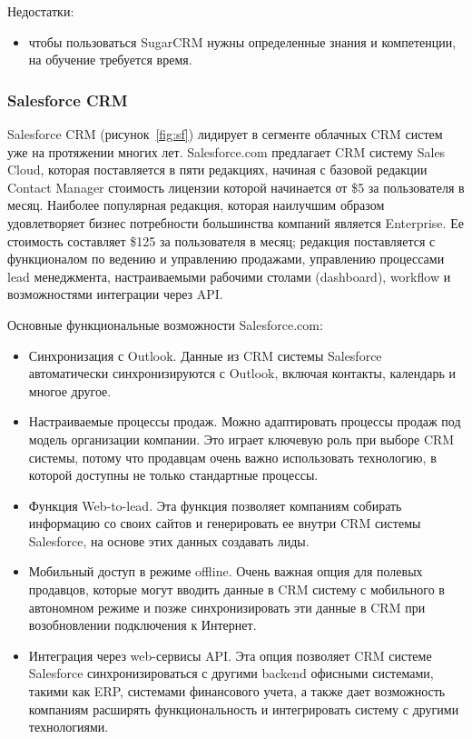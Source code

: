 Недостатки: 
\begin{itemize}
\item чтобы пользоваться SugarCRM нужны определенные знания и компетенции, на обучение требуется время.
\end{itemize}



\subsubsection{Salesforce CRM }
\label{sub:alternatives:crm:sf}
Salesforce CRM (рисунок~\ref{fig:sf}) лидирует в сегменте облачных CRM систем уже на протяжении многих лет. Salesforce.com предлагает CRM систему Sales Cloud, которая поставляется в пяти редакциях, начиная с базовой редакции Contact Manager стоимость лицензии которой начинается от \$5 за пользователя в месяц. Наиболее популярная редакция, которая наилучшим образом удовлетворяет бизнес потребности большинства компаний является Enterprise. Ее стоимость составляет \$125 за пользователя в месяц; редакция поставляется с функционалом по ведению и управлению продажами, управлению процессами lead менеджмента, настраиваемыми рабочими столами (dashboard), workflow и возможностями интеграции через API. 

Основные функциональные возможности Salesforce.com:
\begin{itemize}
\item Синхронизация с Outlook. Данные из CRM системы Salesforce автоматически синхронизируются с Outlook, включая контакты, календарь и многое другое.
\item Настраиваемые процессы продаж. Можно адаптировать процессы продаж под модель организации компании. Это играет ключевую роль при выборе CRM системы, потому что продавцам очень важно использовать технологию, в которой доступны не только стандартные процессы.
\item Функция Web-to-lead. Эта функция позволяет компаниям собирать информацию со своих сайтов и генерировать ее внутри CRM системы Salesforce, на основе этих данных создавать лиды.
\item Мобильный доступ в режиме offline. Очень важная опция для полевых продавцов, которые могут вводить данные в CRM систему с мобильного в автономном режиме и позже синхронизировать эти данные в CRM при возобновлении подключения к Интернет.
\item Интеграция через web-сервисы API. Эта опция позволяет CRM системе Salesforce синхронизироваться с другими backend офисными системами, такими как ERP, системами финансового учета, а также дает возможность компаниям расширять функциональность и интегрировать систему с другими технологиями.
\end{itemize}


